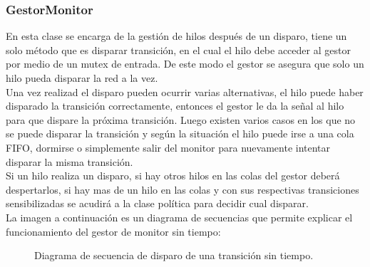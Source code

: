 \documentclass[10pt, a4paper,notitlepage]{article}
\begin{document}
\subsubsection{GestorMonitor}
En esta clase se encarga de la gestión de hilos después de un disparo, tiene un solo método que es disparar transición, en el cual el hilo debe acceder al gestor por medio de un mutex de entrada. De este modo el gestor se asegura que solo un hilo pueda disparar la red a la vez.
\\
Una vez realizad el disparo pueden ocurrir varias alternativas, el hilo puede haber disparado la transición correctamente, entonces el gestor le da la señal al hilo para que dispare la próxima transición. Luego existen varios casos en los que no se puede disparar la transición y según la situación el hilo puede irse a una cola FIFO, dormirse o simplemente salir del monitor para nuevamente intentar disparar la misma transición.
\\
Si un hilo realiza un disparo, si hay otros hilos en las colas del gestor deberá despertarlos, si hay mas de un hilo en las colas y con sus respectivas transiciones sensibilizadas se acudirá a la clase política para decidir cual disparar.
\\
La imagen a continuación es un diagrama de secuencias que permite explicar el funcionamiento del gestor de monitor sin tiempo:

\begin{figure}[H] %
	\caption{Diagrama de secuencia de disparo de una transición sin tiempo.}
	\label{fig:sec}
\end{figure}
\end{document}
